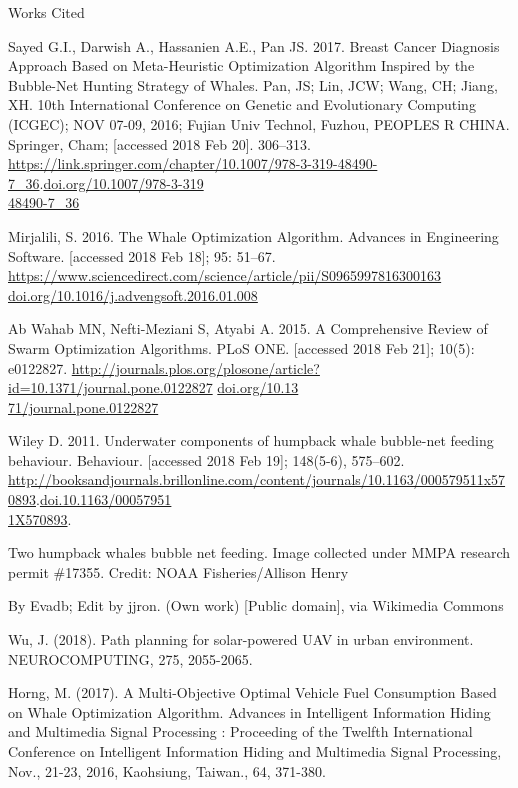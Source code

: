 \documentclass[11pt]{article}
\newcommand{\bibent}{\noindent \hangindent 40pt}
\newenvironment{workscited}{\newpage \begin{center} Works Cited \end{center}}{\newpage }
\begin{document}
\begin{workscited}

\bibent
Sayed G.I., Darwish A., Hassanien A.E., Pan JS. 2017. Breast Cancer Diagnosis Approach Based on Meta-Heuristic Optimization Algorithm Inspired by the Bubble-Net Hunting Strategy of Whales. Pan, JS; Lin, JCW; Wang, CH; Jiang, XH. 10th International Conference on Genetic and Evolutionary Computing (ICGEC); NOV 07-09, 2016; Fujian Univ Technol, Fuzhou, PEOPLES R CHINA. Springer, Cham; [accessed 2018 Feb 20]. 306--313. \url{https://link.springer.com/chapter/10.1007/978-3-319-48490-7_36}.\url{doi.org/10.1007/978-3-319}\\\url{48490-7_36}

\bibent
Mirjalili, S. 2016. The Whale Optimization Algorithm. Advances in Engineering Software. [accessed 2018 Feb 18]; 95: 51--67. \url{https://www.sciencedirect.com/science/article/pii/S0965997816300163} \url{doi.org/10.1016/j.advengsoft.2016.01.008}

\bibent
Ab Wahab MN, Nefti-Meziani S, Atyabi A. 2015. A Comprehensive Review of Swarm Optimization Algorithms. PLoS ONE. [accessed 2018 Feb 21]; 10(5): e0122827. \url{http://journals.plos.org/plosone/article?id=10.1371/journal.pone.0122827} \url{doi.org/10.13}\\\url{71/journal.pone.0122827}

\bibent
Wiley D. 2011. Underwater components of humpback whale bubble-net feeding behaviour. Behaviour. [accessed 2018 Feb 19]; 148(5-6), 575--602. \url{http://booksandjournals.brillonline.com/content/journals/10.1163/000579511x570893}.\url{doi.10.1163/00057951}\\\url{1X570893}.


\bibent %
Two humpback whales bubble net feeding. Image collected under MMPA research permit \#17355.
Credit: NOAA Fisheries/Allison Henry

\bibent %
By Evadb; Edit by jjron. (Own work) [Public domain], via Wikimedia Commons

\bibent
Wu, J. (2018). Path planning for solar-powered UAV in urban environment. NEUROCOMPUTING, 275, 2055-2065.

\bibent
Horng, M. (2017). A Multi-Objective Optimal Vehicle Fuel Consumption Based on Whale Optimization Algorithm. Advances in Intelligent Information Hiding and Multimedia Signal Processing : Proceeding of the Twelfth International Conference on Intelligent Information Hiding and Multimedia Signal Processing, Nov., 21-23, 2016, Kaohsiung, Taiwan., 64, 371-380.

\end{workscited}
\end{document}
